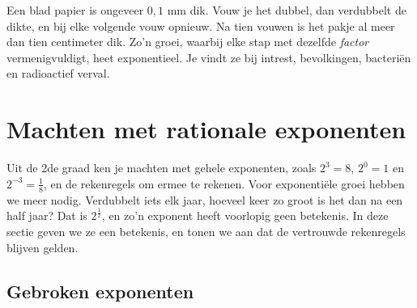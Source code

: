 %



Een blad papier is ongeveer $0{,}1$ mm dik. Vouw je het dubbel, dan verdubbelt de dikte, en bij elke volgende vouw opnieuw. Na tien vouwen is het pakje al meer dan tien centimeter dik. Zo'n groei, waarbij elke stap met dezelfde \textit{factor} vermenigvuldigt, heet exponentieel. Je vindt ze bij intrest, bevolkingen, bacteriën en radioactief verval.

\begin{oefeningen}[Start]

\end{oefeningen}

\section{Machten met rationale exponenten}

Uit de 2de graad ken je machten met gehele exponenten, zoals $2^3 = 8$, $2^0 = 1$ en $2^{-3} = \frac18$, en de rekenregels om ermee te rekenen. Voor exponentiële groei hebben we meer nodig. Verdubbelt iets elk jaar, hoeveel keer zo groot is het dan na een half jaar? Dat is $2^{\frac12}$, en zo'n exponent heeft voorlopig geen betekenis. In deze sectie geven we ze een betekenis, en tonen we aan dat de vertrouwde rekenregels blijven gelden.

\subsection{Gebroken exponenten}

